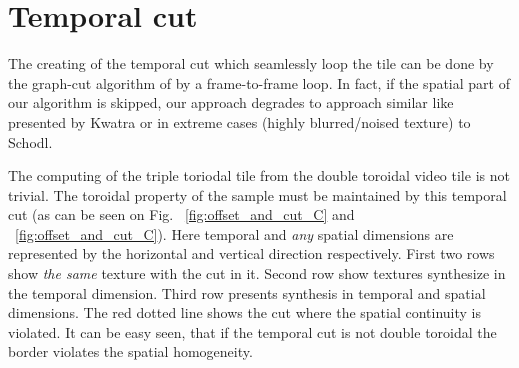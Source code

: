 		\section{Temporal cut}
	
%	
	The creating of the temporal cut which seamlessly loop the tile can be done by the graph-cut algorithm\cite{Kwatra03graphcuttextures} of by a frame-to-frame loop\cite{Schodl00videotextures}. In fact, if the spatial part of our algorithm is skipped, our approach degrades to approach similar like presented by Kwatra\cite{Kwatra03graphcuttextures} or in extreme cases (highly blurred/noised texture) to Schodl\cite{Schodl00videotextures}.

	The computing of the triple toriodal tile from the double toroidal video tile is not trivial. The toroidal property of the sample must be maintained by this temporal cut (as can be seen on Fig. ~\ref{fig:offset_and_cut_C} and ~\ref{fig:offset_and_cut_C}). Here temporal and \emph{any} spatial dimensions are represented by the horizontal and vertical direction respectively. First two rows show \emph{the same} texture with the cut in it. Second row show textures synthesize in the temporal dimension. Third row presents synthesis in temporal and spatial dimensions. The red dotted line shows the cut where the spatial continuity is violated. It can be easy seen, that if the temporal cut is not double toroidal the border violates the spatial homogeneity. 

